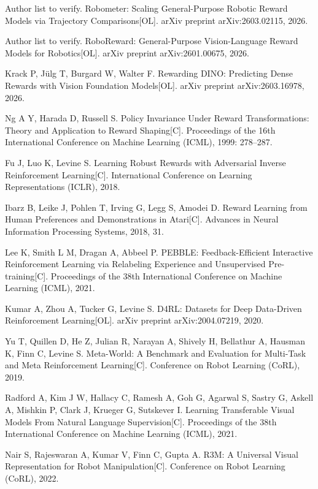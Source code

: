 Author list to verify.
Robometer: Scaling General-Purpose Robotic Reward Models via Trajectory Comparisons[OL].
arXiv preprint arXiv:2603.02115, 2026.

Author list to verify.
RoboReward: General-Purpose Vision-Language Reward Models for Robotics[OL].
arXiv preprint arXiv:2601.00675, 2026.

Krack P, Jülg T, Burgard W, Walter F.
Rewarding DINO: Predicting Dense Rewards with Vision Foundation Models[OL].
arXiv preprint arXiv:2603.16978, 2026.

Ng A Y, Harada D, Russell S.
Policy Invariance Under Reward Transformations: Theory and Application to Reward Shaping[C].
Proceedings of the 16th International Conference on Machine Learning (ICML), 1999: 278--287.

Fu J, Luo K, Levine S.
Learning Robust Rewards with Adversarial Inverse Reinforcement Learning[C].
International Conference on Learning Representations (ICLR), 2018.

Ibarz B, Leike J, Pohlen T, Irving G, Legg S, Amodei D.
Reward Learning from Human Preferences and Demonstrations in Atari[C].
Advances in Neural Information Processing Systems, 2018, 31.

Lee K, Smith L M, Dragan A, Abbeel P.
PEBBLE: Feedback-Efficient Interactive Reinforcement Learning via Relabeling Experience and Unsupervised Pre-training[C].
Proceedings of the 38th International Conference on Machine Learning (ICML), 2021.

Kumar A, Zhou A, Tucker G, Levine S.
D4RL: Datasets for Deep Data-Driven Reinforcement Learning[OL].
arXiv preprint arXiv:2004.07219, 2020.

Yu T, Quillen D, He Z, Julian R, Narayan A, Shively H, Bellathur A, Hausman K, Finn C, Levine S.
Meta-World: A Benchmark and Evaluation for Multi-Task and Meta Reinforcement Learning[C].
Conference on Robot Learning (CoRL), 2019.

Radford A, Kim J W, Hallacy C, Ramesh A, Goh G, Agarwal S, Sastry G, Askell A, Mishkin P, Clark J, Krueger G, Sutskever I.
Learning Transferable Visual Models From Natural Language Supervision[C].
Proceedings of the 38th International Conference on Machine Learning (ICML), 2021.

Nair S, Rajeswaran A, Kumar V, Finn C, Gupta A.
R3M: A Universal Visual Representation for Robot Manipulation[C].
Conference on Robot Learning (CoRL), 2022.

